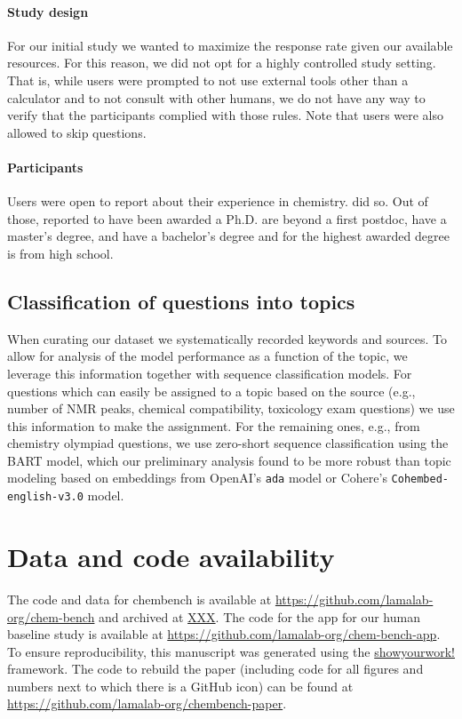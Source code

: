 \documentclass[11pt, oneside]{article}
\begin{document}
\paragraph{Study design}
For our initial study we wanted to maximize the response rate given our available resources. 
For this reason, we did not opt for a highly controlled study setting. 
That is, while users were prompted to not use external tools other than a calculator and to not consult with other humans, we do not have any way to verify that the participants complied with those rules. 
Note that users were also allowed to skip questions.


\paragraph{Participants}
Users were open to report about their experience in chemistry. 
 did so. 
Out of those,  reported to have been awarded a Ph.D.
 are beyond a first postdoc,  have a master's degree, and  have a bachelor's degree and for  the highest awarded degree is from high school.

\subsection{Classification of questions into topics}\label{sec:meth-topic} When curating our dataset we systematically recorded keywords and sources.
To allow for analysis of the model performance as a function of the topic, we leverage this information together with sequence classification models.
For questions which can easily be assigned to a topic based on the source (e.g., number of NMR peaks, chemical compatibility, toxicology exam questions) we use this information to make the assignment.
For the remaining ones, e.g., from chemistry olympiad questions, we use zero-short sequence classification\cite{zeroshotsequence} using the BART model\cite{bart, FacebookBART}, which our preliminary analysis found to be more robust than topic modeling based on embeddings from OpenAI's \texttt{ada} model or Cohere's \texttt{Cohembed-english-v3.0} model.


\section*{Data and code availability}
The code and data for chembench is available at \url{https://github.com/lamalab-org/chem-bench} and archived at \url{XXX}.
The code for the app for our human baseline study is available at \url{https://github.com/lamalab-org/chem-bench-app}. 
To ensure reproducibility, this manuscript was generated using the \href{https://show-your.work/en/latest/}{showyourwork!} framework.\cite{Luger2021}
The code to rebuild the paper (including code for all figures and numbers next to which there is a GitHub icon) can be found at \url{https://github.com/lamalab-org/chembench-paper}.
\end{document}
